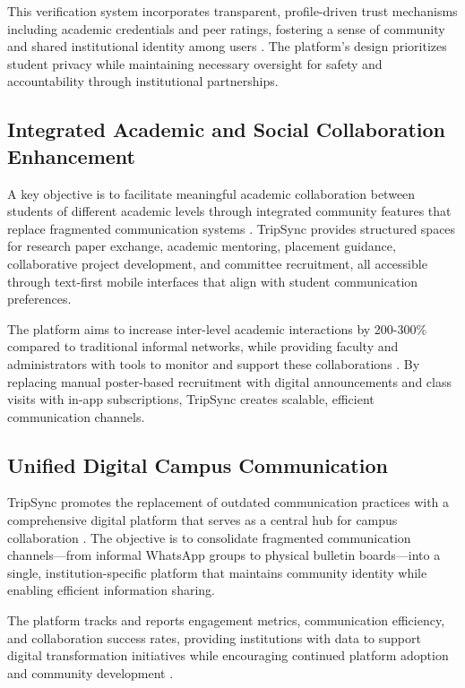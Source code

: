 \documentclass[conference]{IEEEtran}
\begin{document}
This verification system incorporates transparent, profile-driven trust mechanisms including academic credentials and peer ratings, fostering a sense of community and shared institutional identity among users \cite{ref12}\cite{ref13}. The platform's design prioritizes student privacy while maintaining necessary oversight for safety and accountability through institutional partnerships.

\subsection{Integrated Academic and Social Collaboration Enhancement}

A key objective is to facilitate meaningful academic collaboration between students of different academic levels through integrated community features that replace fragmented communication systems \cite{ref14}\cite{ref15}. TripSync provides structured spaces for research paper exchange, academic mentoring, placement guidance, collaborative project development, and committee recruitment, all accessible through text-first mobile interfaces that align with student communication preferences.

The platform aims to increase inter-level academic interactions by 200-300\% compared to traditional informal networks, while providing faculty and administrators with tools to monitor and support these collaborations \cite{ref16}\cite{ref17}. By replacing manual poster-based recruitment with digital announcements and class visits with in-app subscriptions, TripSync creates scalable, efficient communication channels.

\subsection{Unified Digital Campus Communication}

TripSync promotes the replacement of outdated communication practices with a comprehensive digital platform that serves as a central hub for campus collaboration \cite{ref1}\cite{ref2}. The objective is to consolidate fragmented communication channels—from informal WhatsApp groups to physical bulletin boards—into a single, institution-specific platform that maintains community identity while enabling efficient information sharing.

The platform tracks and reports engagement metrics, communication efficiency, and collaboration success rates, providing institutions with data to support digital transformation initiatives while encouraging continued platform adoption and community development \cite{ref3}.
\end{document}

